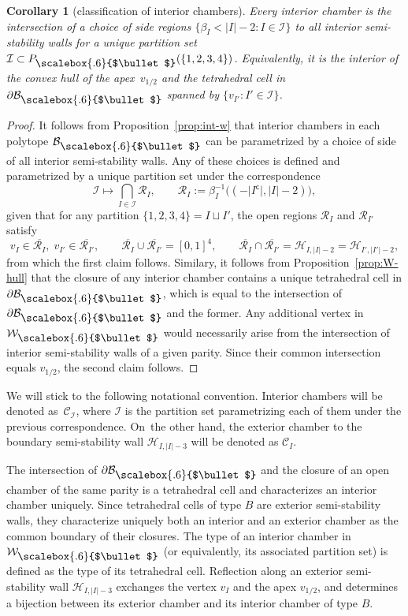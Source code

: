 \documentclass[pdftex]{sigma}
\newcommand\sbul[1][.6]{\mathbin{\vcenter{\hbox{\scalebox{#1}{$\bullet$}}}}}
\newcommand{\qB}{\mathcal{B}}
\newcommand{\qC}{\mathcal{C}}
\newcommand{\qH}{\mathcal{H}}
\newcommand{\qI}{\mathcal{I}}
\newcommand{\qR}{\mathcal{R}}
\newcommand{\qW}{\mathcal{W}}
\numberwithin{equation}{section}
\newtheorem{Corollary}[Theorem]{Corollary}
\begin{document}
\begin{Corollary}[classification of interior chambers]\label{cor:in-chambers}
Every interior chamber is the intersection of a choice of side regions $\{\beta_{I} < \vert I\vert -2 \colon I\in\qI\}$ to all interior semi-stability walls for a unique partition set $\qI\subset P_{\sbul}(\{1,2,3,4\})$. Equivalently, it is the interior of the convex hull of the apex~$v_{1/2}$ and the tetrahedral cell in $\partial\qB_{\sbul}$ spanned by $\{v_{I'}\colon I'\in\qI\}$.
\end{Corollary}
\begin{proof}
It follows from Proposition~\ref{prop:int-w} that interior chambers in each polytope $\qB_{\sbul}$ can be parametrized by a choice of side of all interior semi-stability walls. Any of these choices is defined and parametrized by a unique partition set under the correspondence
\[
\qI \mapsto \bigcap_{I\in\qI} \qR_{I},\qquad
\qR_{I} := \beta^{-1}_{I}\bigl((-\vert I^{\mathsf{c}}\vert,\vert I\vert -2)\bigr),
\]
given that for any partition $\{1,2,3,4\}=I\sqcup I'$, the open regions $\qR_{I}$ and $\qR_{I'}$ satisfy
\[
v_{I}\in\overline{\qR_{I}},\; v_{I'}\in\overline{\qR_{I'}},\qquad
\overline{\qR_{I}}\cup \overline{\qR_{I'}} =[0,1]^{4},\qquad
\overline{\qR_{I}}\cap \overline{\qR_{I'}} = \qH_{I,\vert I\vert -2} = \qH_{I',\vert I'\vert -2},
\]
from which the first claim follows. Similary, it follows from Proposition~\ref{prop:W-hull} that the closure of any interior chamber contains a unique tetrahedral cell in $\partial\qB_{\sbul}$, which is equal to the intersection of $\partial\qB_{\sbul}$ and the former. Any additional vertex in $\qW_{\sbul}$ would necessarily arise from the intersection of interior semi-stability walls of a given parity. Since their common intersection equals $v_{1/2}$, the second claim follows.
\end{proof}

We will stick to the following notational convention. Interior chambers will be denoted as~$\qC_{\qI}$, where $\qI$ is the partition set parametrizing each of them under the previous correspondence. On~the other hand, the exterior chamber to the boundary semi-stability wall $\qH_{I,\vert I\vert - 3}$ will be denoted as $\qC_{I}$.

The intersection of $\partial \qB_{\sbul}$ and the closure of an open chamber of the same parity is a tetrahedral cell and characterizes an interior chamber uniquely. Since tetrahedral cells of type $B$ are exterior semi-stability walls, they characterize uniquely both an interior and an exterior chamber as the common boundary of their closures. The type of an interior chamber in $\qW_{\sbul}$ (or equivalently, its associated partition set) is defined as the type of its tetrahedral cell. Reflection along an exterior semi-stability wall $\qH_{I,\vert I\vert - 3}$ exchanges the vertex $v_{I}$ and the apex $v_{1/2}$, and determines a bijection between its exterior chamber and its interior chamber of type $B$.
\end{document}
